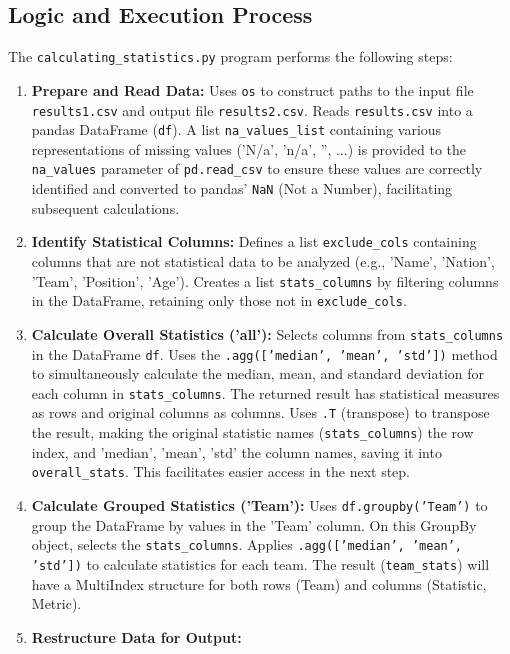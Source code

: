 \documentclass[12pt, a4paper]{report}
\begin{document}
\subsection{Logic and Execution Process}
The \texttt{calculating\_statistics.py} program performs the following steps:
\begin{enumerate}[label=\textbf{Step \arabic*:}, leftmargin=*]
    \item \textbf{Prepare and Read Data:}
    Uses \texttt{os} to construct paths to the input file \texttt{results1.csv} and output file \texttt{results2.csv}.
    Reads \texttt{results.csv} into a pandas DataFrame (\texttt{df}).
    A list \texttt{na\_values\_list} containing various representations of missing values ('N/a', 'n/a', '', ...) is provided to the \texttt{na\_values} parameter of \texttt{pd.read\_csv} to ensure these values are correctly identified and converted to pandas' \texttt{NaN} (Not a Number), facilitating subsequent calculations.
    \item \textbf{Identify Statistical Columns:}
    Defines a list \texttt{exclude\_cols} containing columns that are not statistical data to be analyzed (e.g., 'Name', 'Nation', 'Team', 'Position', 'Age').
    Creates a list \texttt{stats\_columns} by filtering columns in the DataFrame, retaining only those not in \texttt{exclude\_cols}.
    \item \textbf{Calculate Overall Statistics ('all'):}
    Selects columns from \texttt{stats\_columns} in the DataFrame \texttt{df}.
    Uses the \texttt{.agg(['median', 'mean', 'std'])} method to simultaneously calculate the median, mean, and standard deviation for each column in \texttt{stats\_columns}.
    The returned result has statistical measures as rows and original columns as columns.
    Uses \texttt{.T} (transpose) to transpose the result, making the original statistic names (\texttt{stats\_columns}) the row index, and 'median', 'mean', 'std' the column names, saving it into \texttt{overall\_stats}.
    This facilitates easier access in the next step.
    \item \textbf{Calculate Grouped Statistics ('Team'):}
    Uses \texttt{df.groupby('Team')} to group the DataFrame by values in the 'Team' column.
    On this GroupBy object, selects the \texttt{stats\_columns}.
    Applies \texttt{.agg(['median', 'mean', 'std'])} to calculate statistics for each team.
    The result (\texttt{team\_stats}) will have a MultiIndex structure for both rows (Team) and columns (Statistic, Metric).
    \item \textbf{Restructure Data for Output:}

\end{enumerate}
\end{document}
